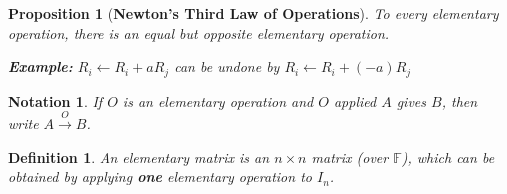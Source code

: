 \documentclass[12pt]{article}
\newtheorem{definition}{Definition}[subsection]
\newtheorem{proposition}{Proposition}[subsection]
\newtheorem{notation}{Notation}[subsection]
\newcommand{\mF}{{\mathbb{F}}}
\begin{document}
	\begin{proposition}[\textbf{Newton's Third Law of Operations}]
		To every elementary operation, there is an equal but opposite 
		elementary operation. 
	
		{\color{Brown}
		\textbf{Example: } $R_i \leftarrow R_i + aR_j$
		can be undone by $R_i \leftarrow R_i + (-a)R_j$\\
		}
	\end{proposition}

	\begin{notation}
		If $O$ is an elementary operation and $O$ applied
		$A$ gives $B$, then write $A \overset{O}{\longrightarrow} B$. 
	\end{notation}

	\begin{definition}
		An elementary matrix is an $n\times n$ matrix (over $\mF$), which can 
		be obtained by applying \textbf{one} elementary operation to $I_n$. 
	\end{definition}
\end{document}
